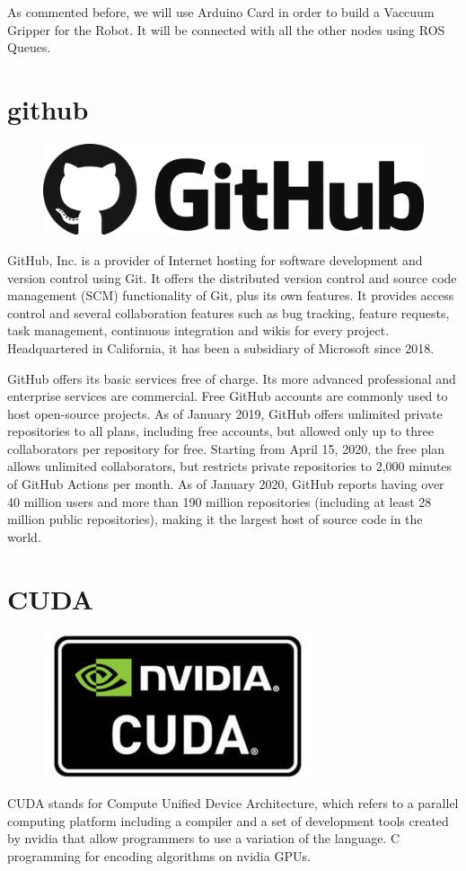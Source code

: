 		As commented before, we will use Arduino Card in order to build a Vaccuum Gripper for the Robot. It will be connected with all the other nodes using ROS Queues.


	\section{github}
		\begin{figure}[h!]
			\centering
			\includegraphics[width=0.7\linewidth]{Images/logos/github}
			\label{fig:github}
		\end{figure}
		GitHub, Inc. is a provider of Internet hosting for software development and version control using Git. It offers the distributed version control and source code management (SCM) functionality of Git, plus its own features. It provides access control and several collaboration features such as bug tracking, feature requests, task management, continuous integration and wikis for every project. Headquartered in California, it has been a subsidiary of Microsoft since 2018.
			
		GitHub offers its basic services free of charge. Its more advanced professional and enterprise services are commercial. Free GitHub accounts are commonly used to host open-source projects. As of January 2019, GitHub offers unlimited private repositories to all plans, including free accounts, but allowed only up to three collaborators per repository for free. Starting from April 15, 2020, the free plan allows unlimited collaborators, but restricts private repositories to 2,000 minutes of GitHub Actions per month. As of January 2020, GitHub reports having over 40 million users  and more than 190 million repositories  (including at least 28 million public repositories),  making it the largest host of source code in the world.

	\section{CUDA}
		\begin{figure}[h!]
			\centering
			\includegraphics[width=0.7\linewidth]{Images/logos/cuda}
			\label{fig:cuda}
		\end{figure}
		CUDA stands for Compute Unified Device Architecture, which refers to a parallel computing platform including a compiler and a set of development tools created by nvidia that allow programmers to use a variation of the language. C programming for encoding algorithms on nvidia GPUs.

